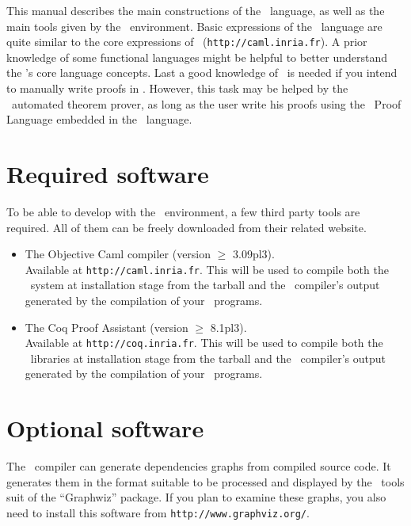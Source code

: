 This manual describes the main constructions of the \focal\ language,
as well as the main tools given by the \focal\ environment. Basic
expressions of the \focal\ language are quite similar to the core
expressions of \ocaml\
(\verb+http://caml.inria.fr+). A prior knowledge of some functional
languages might be helpful to better understand the \focal's core
language concepts. Last a good knowledge of \coq\ is needed if you
intend to manually write proofs in \focal{}. However, this task may be
helped by the \zenon\ automated theorem prover, as long as the user
write his proofs using the \focal\ Proof Language embedded in the
\focal\ language.



\section{Required software}
To be able to develop with the \focal\ environment, a few third party
tools are required. All of them can be freely downloaded from their
related website.
\begin{itemize}
  \item The Objective Caml compiler (version $\geq$ 3.09pl3). \\
    Available
    at \verb+http://caml.inria.fr+. This will be used to compile both
    the \focal\ system at installation stage from the tarball and
    the \focal\ compiler's output generated by the compilation of
    your \focal\ programs.

  \item The Coq Proof Assistant (version $\geq$ 8.1pl3). \\
     Available at
    \verb+http://coq.inria.fr+. This will be used to compile both
    the \focal\ libraries at installation stage from the tarball and
    the \focal\ compiler's output generated by the compilation of
    your \focal\ programs.
\end{itemize}



\section{Optional software}
The \focal\ compiler can generate dependencies graphs from compiled
source code. It generates them in the format suitable to be processed
and displayed by the \dotty\ tools suit of the ``Graphwiz'' package. If
you plan to examine these graphs, you also need to install this
software from \verb+http://www.graphviz.org/+.




